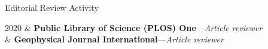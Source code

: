 \begin{rSection}{Editorial Review Activity}
	\begin{timeline}
		2020 & \textbf{Public Library of Science (PLOS) One}---\textit{Article reviewer}\\
		& \textbf{Geophysical Journal International}---\textit{Article reviewer}
	\end{timeline}
\end{rSection}